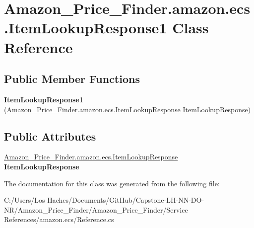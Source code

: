\hypertarget{class_amazon___price___finder_1_1amazon_1_1ecs_1_1_item_lookup_response1}{\section{Amazon\-\_\-\-Price\-\_\-\-Finder.\-amazon.\-ecs.\-Item\-Lookup\-Response1 Class Reference}
\label{class_amazon___price___finder_1_1amazon_1_1ecs_1_1_item_lookup_response1}
}
\subsection*{Public Member Functions}
\begin{DoxyCompactItemize}
\item 
\hypertarget{class_amazon___price___finder_1_1amazon_1_1ecs_1_1_item_lookup_response1_abf464ea338e1149f04ac8958e7d43fa7}{{\bfseries Item\-Lookup\-Response1} (\hyperlink{class_amazon___price___finder_1_1amazon_1_1ecs_1_1_item_lookup_response}{Amazon\-\_\-\-Price\-\_\-\-Finder.\-amazon.\-ecs.\-Item\-Lookup\-Response} \hyperlink{class_amazon___price___finder_1_1amazon_1_1ecs_1_1_item_lookup_response}{Item\-Lookup\-Response})}\label{class_amazon___price___finder_1_1amazon_1_1ecs_1_1_item_lookup_response1_abf464ea338e1149f04ac8958e7d43fa7}

\end{DoxyCompactItemize}
\subsection*{Public Attributes}
\begin{DoxyCompactItemize}
\item 
\hypertarget{class_amazon___price___finder_1_1amazon_1_1ecs_1_1_item_lookup_response1_a44861d4768aac49b297c227cee847f59}{\hyperlink{class_amazon___price___finder_1_1amazon_1_1ecs_1_1_item_lookup_response}{Amazon\-\_\-\-Price\-\_\-\-Finder.\-amazon.\-ecs.\-Item\-Lookup\-Response} {\bfseries Item\-Lookup\-Response}}\label{class_amazon___price___finder_1_1amazon_1_1ecs_1_1_item_lookup_response1_a44861d4768aac49b297c227cee847f59}

\end{DoxyCompactItemize}


The documentation for this class was generated from the following file\-:\begin{DoxyCompactItemize}
\item 
C\-:/\-Users/\-Los Haches/\-Documents/\-Git\-Hub/\-Capstone-\/\-L\-H-\/\-N\-N-\/\-D\-O-\/\-N\-R/\-Amazon\-\_\-\-Price\-\_\-\-Finder/\-Amazon\-\_\-\-Price\-\_\-\-Finder/\-Service References/amazon.\-ecs/Reference.\-cs\end{DoxyCompactItemize}
